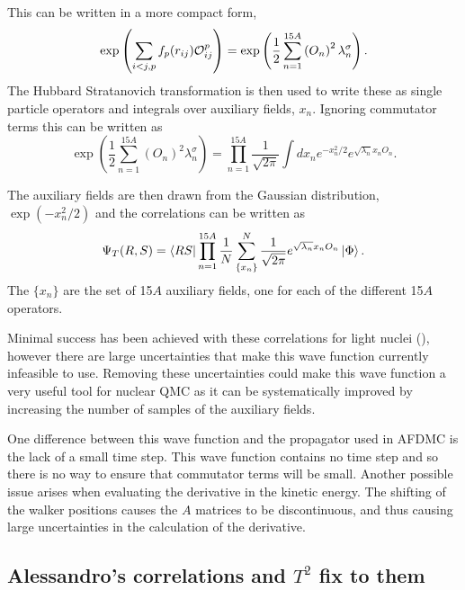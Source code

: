 This can be written in a more compact form,
\begin{equation}
    \exp\left(\sum\limits_{i<j,p}f_p(r_{ij})\mathcal{O}^p_{ij}\right) = \exp\left(\frac{1}{2}\sum\limits_{n=1}^{15A} \left(O_{n}\right)^2 \lambda_n^{\sigma}\right).
\end{equation}
The Hubbard Stratanovich transformation is then used to write these as single particle operators and integrals over auxiliary fields, $x_n$. Ignoring commutator terms this can be written as
\begin{equation}
   \exp\left(\frac{1}{2}\sum\limits_{n=1}^{15A} \left(O_{n}\right)^2 \lambda_n^{\sigma}\right) = \prod\limits_{n=1}^{15A} \frac{1}{\sqrt{2\pi}}\int dx_n e^{-x_n^2/2}e^{\sqrt{\lambda_n}x_nO_n}.
\end{equation}

The auxiliary fields are then drawn from the Gaussian distribution, $\exp\left(-x_n^2/2\right)$ and the correlations can be written as
\begin{equation}
   \Psi_T(R,S) = \left< RS \right|\prod\limits_{n=1}^{15A} \frac{1}{N} \sum\limits_{\{x_n\}}^N\frac{1}{\sqrt{2\pi}}e^{\sqrt{\lambda_n}x_nO_n}\left| \Phi \right>.
\end{equation}
The $\{x_n\}$ are the set of 15$A$ auxiliary fields, one for each of the different 15$A$ operators.

Minimal success has been achieved with these correlations for light nuclei (\cite{bouadani2009_dissertation}), however there are large uncertainties that make this wave function currently infeasible to use. Removing these uncertainties could make this wave function a very useful tool for nuclear QMC as it can be systematically improved by increasing the number of samples of the auxiliary fields.

One difference between this wave function and the propagator used in AFDMC is the lack of a small time step. This wave function contains no time step and so there is no way to ensure that commutator terms will be small. Another possible issue arises when evaluating the derivative in the kinetic energy. The shifting of the walker positions causes the $A$ matrices to be discontinuous, and thus causing large uncertainties in the calculation of the derivative.

\subsection{Alessandro's correlations and $T^2$ fix to them}
